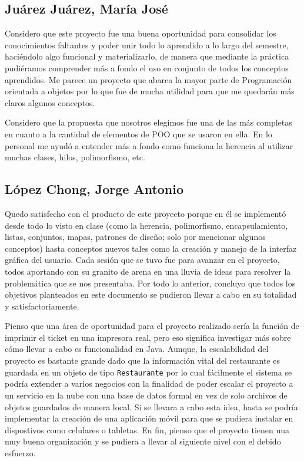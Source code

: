 \newpage

\subsection*{Juárez Juárez, María José}
Considero que este proyecto fue una buena oportunidad para consolidar los conocimientos faltantes y 
poder unir todo lo aprendido a lo largo del semestre, haciéndolo algo funcional y materializarlo, de 
manera que mediante la práctica pudiéramos comprender más a fondo el uso en conjunto de todos los 
conceptos aprendidos. 
Me parece un proyecto que abarca la mayor parte de Programación orientada a 
objetos por lo que fue de mucha utilidad para que me quedarán más claros algunos conceptos. 


Considero que la propuesta que nosotros elegimos fue una de las más completas en cuanto 
a la cantidad de elementos de POO que se usaron en ella. 
En lo personal me ayudó a entender más a fondo como funciona la herencia al utilizar 
muchas clases, hilos, polimorfismo, etc.


\newpage

\subsection*{López Chong, Jorge Antonio}
Quedo satisfecho con el producto de este proyecto porque en él se implementó desde todo lo visto en clase
(como la herencia, polimorfismo, encapsulamiento, listas, conjuntos, mapas, patrones de diseño; solo por
mencionar algunos conceptos) hasta conceptos nuevos tales como la creación y manejo de la interfaz
gráfica del usuario. Cada sesión que se tuvo fue para avanzar en el proyecto, todos aportando con su granito
de arena en una lluvia de ideas para resolver la problemática que se nos presentaba. Por todo lo anterior,
concluyo que todos los objetivos planteados en este documento se pudieron llevar a cabo en su totalidad y
satisfactoriamente.

Pienso que una área de oportunidad para el proyecto realizado sería la función de imprimir el ticket en una
impresora real, pero eso significa investigar más sobre cómo llevar a cabo es funcionalidad en Java. Aunque,
la escalabilidad del proyecto es bastante grande dado que la información vital del restaurante es guardada
en un objeto de tipo \texttt{Restaurante} por lo cual fácilmente el sistema se podría extender a varios
negocios con la finalidad de poder escalar el proyecto a un servicio en la nube con una base de datos formal
en vez de solo archivos de objetos guardados de manera local. Si se llevara a cabo esta idea, hasta se podría
implementar la creación de una aplicación móvil para que se pudiera instalar en dispostivos como celulares o
tabletas. En fin, pienso que el proyecto tienen una muy buena organización y se pudiera a llevar al siguiente
nivel con el debido esfuerzo.

